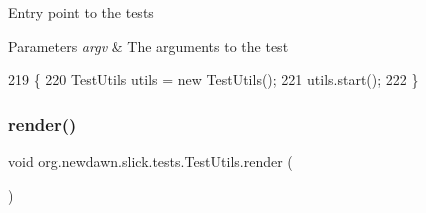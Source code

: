 Entry point to the tests


\begin{DoxyParams}{Parameters}
{\em argv} & The arguments to the test \\
\hline
\end{DoxyParams}

\begin{DoxyCode}
219                                            \{
220         TestUtils utils = \textcolor{keyword}{new} TestUtils();
221         utils.start();
222     \}
\end{DoxyCode}
\mbox{\label{classorg_1_1newdawn_1_1slick_1_1tests_1_1_test_utils_ad588dc36052b23fc284e1f9cc3baf498}} 
\subsubsection{\texorpdfstring{render()}{render()}}
{\footnotesize\ttfamily void org.\+newdawn.\+slick.\+tests.\+Test\+Utils.\+render (\begin{DoxyParamCaption}{ }\end{DoxyParamCaption})\hspace{0.3cm}{\ttfamily [inline]}}

